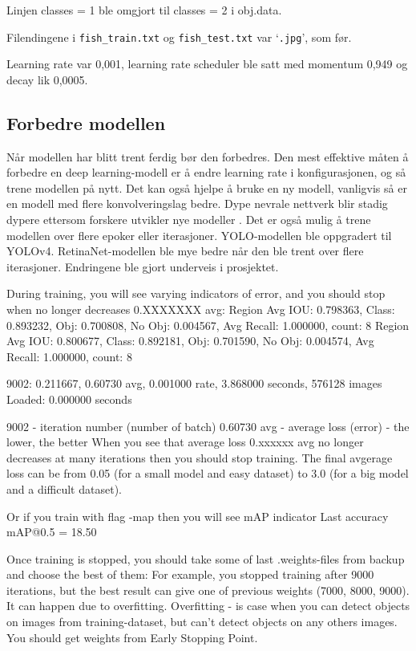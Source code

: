Linjen classes = 1 ble omgjort til classes = 2 i obj.data. 

Filendingene i \texttt{fish\_train.txt} og \texttt{fish\_test.txt} var `\texttt{.jpg}', som før.

Learning rate var 0,001, learning rate scheduler ble satt med momentum 0,949 og decay lik 0,0005.

\subsection{Forbedre modellen}

Når modellen har blitt trent ferdig bør den forbedres. Den mest effektive måten å forbedre en deep learning-modell er å endre learning rate i konfigurasjonen, og så trene modellen på nytt. Det kan også hjelpe å bruke en ny modell, vanligvis så er en modell med flere konvolveringslag bedre. Dype nevrale nettverk blir stadig dypere ettersom forskere utvikler nye modeller \cite{Szegedy m.fl. s. 1}. Det er også mulig å trene modellen over flere epoker eller iterasjoner. YOLO-modellen ble oppgradert til YOLOv4. RetinaNet-modellen ble mye bedre når den ble trent over flere iterasjoner. Endringene ble gjort underveis i prosjektet. 

During training, you will see varying indicators of error, and you should stop when no longer decreases 0.XXXXXXX avg:
Region Avg IOU: 0.798363, Class: 0.893232, Obj: 0.700808, No Obj: 0.004567, Avg Recall: 1.000000, count: 8 Region Avg IOU: 0.800677, Class: 0.892181, Obj: 0.701590, No Obj: 0.004574, Avg Recall: 1.000000, count: 8

9002: 0.211667, 0.60730 avg, 0.001000 rate, 3.868000 seconds, 576128 images Loaded: 0.000000 seconds

9002 - iteration number (number of batch)
0.60730 avg - average loss (error) - the lower, the better
When you see that average loss 0.xxxxxx avg no longer decreases at many iterations then you should stop training. The final avgerage loss can be from 0.05 (for a small model and easy dataset) to 3.0 (for a big model and a difficult dataset).

Or if you train with flag -map then you will see mAP indicator Last accuracy mAP@0.5 = 18.50%

Once training is stopped, you should take some of last .weights-files from backup and choose the best of them:
For example, you stopped training after 9000 iterations, but the best result can give one of previous weights (7000, 8000, 9000). It can happen due to overfitting. Overfitting - is case when you can detect objects on images from training-dataset, but can't detect objects on any others images. You should get weights from Early Stopping Point.

